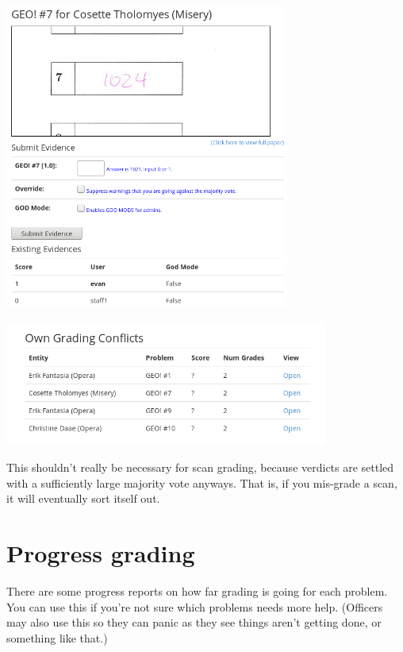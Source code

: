 \begin{center}
	\includegraphics[width=0.7\textwidth]{images/viewverdict.png}
\end{center}
\begin{center}
	\includegraphics[width=0.8\textwidth]{images/viewconflict.png}
\end{center}

This shouldn't really be necessary for scan grading,
because verdicts are settled with a sufficiently large majority vote anyways.
That is, if you mis-grade a scan, it will eventually sort itself out.

\section{Progress grading}
There are some progress reports on how far grading is going for each problem.
You can use this if you're not sure which problems needs more help.
(Officers may also use this so they can panic as they see things aren't getting done,
or something like that.)

